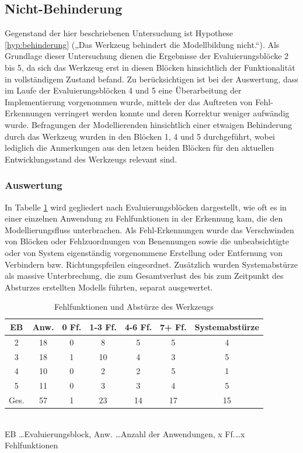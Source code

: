
\subsection{Nicht-Behinderung} %
\label{sub:nicht_behinderung}

Gegenstand der hier beschriebenen Untersuchung ist Hypothese \ref{hyp:behinderung} („Das Werkzeug behindert die Modellbildung nicht.“). Als Grundlage dieser Untersuchung dienen die Ergebnisse der Evaluierungsblöcke 2 bis 5, da sich das Werkzeug erst in diesen Blöcken hinsichtlich der Funktionalität in vollständigem Zustand befand. Zu berücksichtigen ist bei der Auswertung, dass im Laufe der Evaluierungsblöcken 4 und 5 eine Überarbeitung der Implementierung vorgenommen wurde, mittels der das Auftreten von Fehl-Erkennungen verringert werden konnte und deren Korrektur weniger aufwändig wurde. Befragungen der Modellierenden hinsichtlich einer etwaigen Behinderung durch das Werkzeug wurden in den Blöcken 1, 4 und 5 durchgeführt, wobei lediglich die Anmerkungen aus den letzen beiden Blöcken für den aktuellen Entwicklungsstand des Werkzeugs relevant sind.

\subsubsection{Auswertung} 

In Tabelle \ref{tab:fehlfunktionen} wird gegliedert nach Evaluierungsblöcken dargestellt, wie oft es in einer einzelnen Anwendung zu Fehlfunktionen in der Erkennung kam, die den Modellierungsfluss unterbrachen. Als Fehl-Erkennungen wurde das Verschwinden von Blöcken oder Fehlzuordnungen von Benennungen sowie die unbeabsichtigte oder von System eigenständig vorgenommene Erstellung oder Entfernung von Verbindern bzw. Richtungspfeilen eingeordnet. Zusätzlich wurden Systemabstürze als massive Unterbrechung, die zum Gesamtverlust des bis zum Zeitpunkt des Absturzes erstellten Modells führten, separat ausgewertet.

\begin{table}[htbp]
	\centering
	\caption{Fehlfunktionen und Abstürze des Werkzeugs}
\begin{tabular}{| c || c || c | c | c | c || c |}
  \hline
   EB    & Anw. & 0 Ff. & 1-3 Ff. & 4-6 Ff. & 7+ Ff. & Systemabstürze \\ \hline
   2     & 18 & 0 &  8 &  5 &  5 &  4 \\ 
   3     & 18 & 1 & 10 &  4 &  3 &  5 \\ 
   4     & 10 & 0 &  2 &  2 &  5 &  1 \\ 
   5     & 11 & 0 &  3 &  3 &  4 &  5 \\ \hline
   Ges.  & 57 & 1 & 23 & 14 & 17 & 15 \\ \hline
\end{tabular} \\
\footnotesize EB \ldots Evaluierungsblock, Anw. \ldots Anzahl der Anwendungen, x Ff.\ldots x Fehlfunktionen
	\label{tab:fehlfunktionen}
\end{table}

